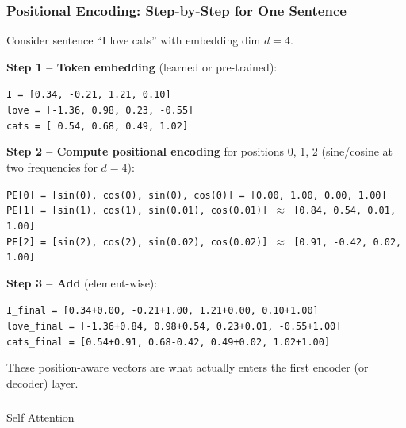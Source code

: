 \begin{frame}[fragile]\frametitle{Positional Encoding: Step-by-Step for One Sentence}

Consider sentence ``I love cats'' with embedding dim $d=4$.

\textbf{Step 1 -- Token embedding} (learned or pre-trained):
\begin{center}
\texttt{I    = [0.34, -0.21,  1.21,  0.10]} \\
\texttt{love = [-1.36, 0.98,  0.23, -0.55]} \\
\texttt{cats = [ 0.54, 0.68,  0.49,  1.02]}
\end{center}

\textbf{Step 2 -- Compute positional encoding} for positions 0, 1, 2 (sine/cosine at two frequencies for $d=4$):
\begin{center}
\texttt{PE[0] = [sin(0), cos(0), sin(0), cos(0)] = [0.00, 1.00, 0.00, 1.00]} \\
\texttt{PE[1] = [sin(1), cos(1), sin(0.01), cos(0.01)] $\approx$ [0.84, 0.54, 0.01, 1.00]} \\
\texttt{PE[2] = [sin(2), cos(2), sin(0.02), cos(0.02)] $\approx$ [0.91, -0.42, 0.02, 1.00]}
\end{center}

\textbf{Step 3 -- Add} (element-wise):
\begin{center}
\texttt{I\_final    = [0.34+0.00, -0.21+1.00, 1.21+0.00, 0.10+1.00]} \\
\texttt{love\_final = [-1.36+0.84, 0.98+0.54, 0.23+0.01, -0.55+1.00]} \\
\texttt{cats\_final = [0.54+0.91, 0.68-0.42, 0.49+0.02, 1.02+1.00]}
\end{center}

These position-aware vectors are what actually enters the first encoder (or decoder) layer.

\end{frame}

\begin{frame}[fragile]\frametitle{}
\begin{center}
{\Large Self Attention}
\end{center}
\end{frame}

